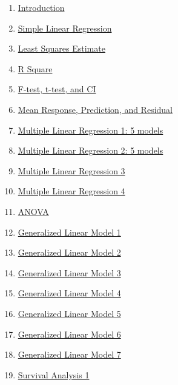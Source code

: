\documentclass[11pt]{article}
\begin{document}
\begin{multicols}{2}
	\begin{enumerate}
		\item \href{https://mp.weixin.qq.com/s/zu2rZKl4vetkip8m6PDkXg}{Introduction}	%
		\item \href{https://mp.weixin.qq.com/s/a8urgkUL3S7r8DyQHML-dw}{Simple Linear Regression}	%
		\item \href{https://mp.weixin.qq.com/s/UQ-d8_wyUNcW2fEqStm29w}{Least Squares Estimate}	%
		\item \href{https://mp.weixin.qq.com/s/Em5nvP4F_K1ctnZkcY6wSg}{R Square}	%
		\item \href{https://mp.weixin.qq.com/s/5sTxbsfHdLNw1k11a8-2OQ}{F-test, t-test, and CI}	%
		\item \href{https://mp.weixin.qq.com/s/jID32_xlslFx3cmAZxLLDQ}{Mean Response, Prediction, and Residual}	%
		\item \href{https://mp.weixin.qq.com/s/zY_vg96mpC4pLbQahti9ZA}{Multiple Linear Regression 1: 5 models}	%
		\item \href{https://mp.weixin.qq.com/s/J7qKWPe2-OGaEhhAzE2bjQ}{Multiple Linear Regression 2: 5 models}	%
		\item \href{https://mp.weixin.qq.com/s/vSYsD8ghV660FSmq9-WGfA}{Multiple Linear Regression 3}	%
		\item \href{https://mp.weixin.qq.com/s/wHFZfm5u5uo2ni7oF8r7GQ}{Multiple Linear Regression 4}	%
		\item \href{https://mp.weixin.qq.com/s/4spXA_mZyHvt8IXU2XLNAg}{ANOVA}	%
		\item \href{https://mp.weixin.qq.com/s/Ldefj0fXiUOtaz1022Sqew}{Generalized Linear Model 1}	%
		\item \href{https://mp.weixin.qq.com/s/fvkf8diVxu0ovaVGerdV6Q}{Generalized Linear Model 2}	%
		\item \href{https://mp.weixin.qq.com/s/yu6FmapfvcsBo0zeR7IyHQ}{Generalized Linear Model 3}	%
		\item \href{https://mp.weixin.qq.com/s/JX29eI9ZhNl1Sw851zVDtQ}{Generalized Linear Model 4}	%
		\item \href{https://mp.weixin.qq.com/s/PIn6p3GR9ivEJV9W3cx2mg}{Generalized Linear Model 5}	%
		\item \href{https://mp.weixin.qq.com/s/xsYG6X17_-AYB9YmvL6uNA}{Generalized Linear Model 6}	%
		\item \href{https://mp.weixin.qq.com/s/DAzii_6NPXNbI6K0cuywwg}{Generalized Linear Model 7}	%
		\item \href{https://mp.weixin.qq.com/s/h097IZjtDvQ_JnOOV1A4HQ}{Survival Analysis 1}	%

\end{enumerate}
\end{multicols}
\end{document}
